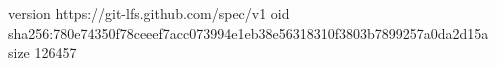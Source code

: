 version https://git-lfs.github.com/spec/v1
oid sha256:780e74350f78ceeef7acc073994e1eb38e56318310f3803b7899257a0da2d15a
size 126457
